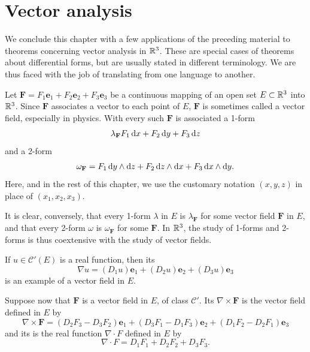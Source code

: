 
\section{Vector analysis}

We conclude this chapter with a few applications of the preceding material to theorems concerning vector analysis in ${\protect\mathbb R}^3$. 
These are special cases of theorems about differential forms, but are usually stated in different terminology. 
We are thus faced with the job of translating from one language to another.

\begin{mydef}
    \label{mydef:10.42}
    Let $\mathbf{F} = 
    F_1 \mathbf{e}_1 + 
    F_2 \mathbf{e}_2 + 
    F_3 \mathbf{e}_3$ 
    be a continuous mapping of
    an open set $E \subset {\protect\mathbb R}^3$ into ${\protect\mathbb R}^3$. 
    Since $\mathbf{F}$ associates a vector to each point of $E$, 
    $\mathbf{F}$ is sometimes called a vector field, especially in physics. 
    With every such $\mathbf{F}$ is associated a 1-form
    \begin{equation}
        \label{eq:10.124}
        \lambda_{\mathbf{F}} 
        F_1 \d x + 
        F_2 \d y + 
        F_3 \d z
    \end{equation}
    and a 2-form 
    \begin{equation}
        \label{eq:10.125}
        \omega_{\mathbf{F}} = 
        F_1 \d y \wedge \d z + 
        F_2 \d z \wedge \d x + 
        F_3 \d x \wedge \d y .
    \end{equation}
    Here, and in the rest of this chapter, we use the customary notation $(x, y, z)$ in place of $(x_1, x_2 , x_3)$.

    It is clear, conversely, 
    that every 1-form $\lambda$ in $E$ is $\lambda_{\mathbf{F}}$ for some vector field $\mathbf{F}$ in $E$, and 
    that every 2-form $\omega$ is $\omega_{\mathbf{F}}$ for some $\mathbf{F}$. 
    In ${\protect\mathbb R}^3$, the study of 1-forms and 2-forms is thus coextensive with the study of vector fields.

    If $u \in \mathscr{C}'(E)$ is a real function, then its 
    \begin{equation*}
        \nabla u = 
        (D_1 u) \mathbf{e}_1 + 
        (D_2 u) \mathbf{e}_2 + 
        (D_3 u) \mathbf{e}_3 
    \end{equation*}
    is an example of a vector field in $E$.

    Suppose now that $\mathbf{F}$ is a vector field in $E$, of class $\mathscr{C}'$.
    Its  $\nabla \times \mathbf{F}$ is the vector field defined in $E$ by 
    \begin{equation*}
        \nabla \times \mathbf{F} = 
        (D_2 F_3 - D_3 F_2) \mathbf{e}_1 + 
        (D_3 F_1 - D_1 F_3) \mathbf{e}_2 + 
        (D_1 F_2 - D_2 F_1) \mathbf{e}_3 
    \end{equation*}
    and its  is the real function $\nabla \cdot F$ defined in $E$ by
    \begin{equation*}
        \nabla \cdot F = 
        D_1 F_1 + 
        D_2 F_2 + 
        D_3 F_3 .
    \end{equation*}
\end{mydef}
